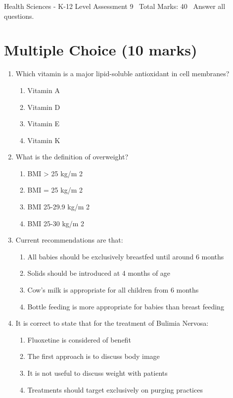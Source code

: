 \documentclass[12pt]{article}
\begin{document}
\begin{center}
Health Sciences - K-12 Level Assessment 9 \
Total Marks: 40 \
Answer all questions.
\end{center}

\section*{Multiple Choice (10 marks)}
\begin{enumerate}[label=\arabic*.]
\item Which vitamin is a major lipid-soluble antioxidant in cell membranes?
\begin{enumerate}[label=(\alph*)]
    \item Vitamin A
    \item Vitamin D
    \item Vitamin E
    \item Vitamin K
\end{enumerate}
\item What is the definition of overweight?
\begin{enumerate}[label=(\alph*)]
    \item BMI \textgreater{} 25 kg/m 2
    \item BMI = 25 kg/m 2
    \item BMI 25-29.9 kg/m 2
    \item BMI 25-30 kg/m 2
\end{enumerate}
\item Current recommendations are that:
\begin{enumerate}[label=(\alph*)]
    \item All babies should be exclusively breastfed until around 6 months
    \item Solids should be introduced at 4 months of age
    \item Cow's milk is appropriate for all children from 6 months
    \item Bottle feeding is more appropriate for babies than breast feeding
\end{enumerate}
\item It is correct to state that for the treatment of Bulimia Nervosa:
\begin{enumerate}[label=(\alph*)]
    \item Fluoxetine is considered of benefit
    \item The first approach is to discuss body image
    \item It is not useful to discuss weight with patients
    \item Treatments should target exclusively on purging practices

\end{enumerate}
\end{enumerate}
\end{document}
